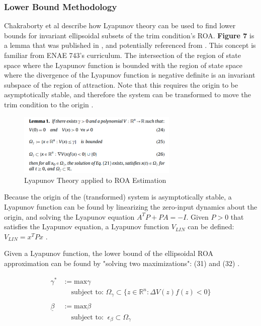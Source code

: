 \documentclass[%
 reprint,
 amsmath,amssymb,
 aps,
]{revtex4-2}
\begin{document}
\subsubsection{Lower Bound Methodology}
Chakraborty et al describe how Lyapunov theory can be used to find lower bounds for invariant ellipsoidal subsets of the trim condition's ROA. \textbf{Figure 7} is a lemma that was published in \cite{primary}, and potentially referenced from \cite{lemma}. This concept is familiar from ENAE 743's curriculum. The intersection of the region of state space where the Lyapunov function is bounded with the region of state space where the divergence of the Lyapunov function is negative definite is an invariant subspace of the region of attraction. Note that this requires the origin to be asymptotically stable, and therefore the system can be transformed to move the trim condition to the origin \cite{primary}.

\begin{figure}
    \centering
    \includegraphics[width=3in]{lemma1.png}
    \caption{Lyapunov Theory applied to ROA Estimation \cite{primary}\cite{lemma}}
    \label{fig:lemma_labell}
\end{figure}

Because the origin of the (transformed) system is asymptotically stable, a Lyapunov function can be found by linearizing the zero-input dynamics about the origin, and solving the Lyapunov equation $A^T P + P A = -I$. Given $P>0$ that satisfies the Lyapunov equation, a Lyapunov function $V_{LIN}$ can be defined: $V_{LIN} = x^T P x$ \cite{primary}.

Given a Lyapunov function, the lower bound of the ellipsoidal ROA approximation can be found by "solving two maximizations": (31) and (32) \cite{primary}.

\begin{align*}
    \gamma^* &:= \text{max}\gamma \\
    &\ \ \ \ \text{ subject to: } \Omega_\gamma \subset \{ z \in \mathbb{R}^n : \Delta V(z)f(z) < 0 \} \tag{31} \\ \\
    \underline{\beta} &:= \text{max}\beta \\
    &\ \ \ \ \text{ subject to: } \ \epsilon_\beta \subset \Omega_\gamma \tag{32}
\end{align*}
\end{document}
